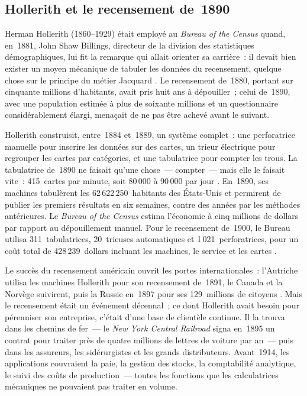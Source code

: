 \subsection{Hollerith et le recensement de~1890}\label{subsec:hollerith}

Herman Hollerith (1860--1929) était employé au \emph{Bureau of the Census} quand, en~1881, John Shaw Billings, directeur de la division des statistiques démographiques, lui fit la remarque qui allait orienter sa carrière~: il devait bien exister un moyen mécanique de tabuler les données du recensement, quelque chose sur le principe du métier Jacquard \parencite{cortada_before_1993}. Le recensement de~1880, portant sur cinquante millions d'habitants, avait pris huit ans à dépouiller~; celui de~1890, avec une population estimée à plus de soixante millions et un questionnaire considérablement élargi, menaçait de ne pas être achevé avant le suivant.

Hollerith construisit, entre~1884 et~1889, un système complet~: une perforatrice manuelle pour inscrire les données sur des cartes, un trieur électrique pour regrouper les cartes par catégories, et une tabulatrice pour compter les trous. La tabulatrice de~1890 ne faisait qu'une chose~--- compter~--- mais elle le faisait vite~: 415~cartes par minute, soit 80\,000 à 90\,000 par jour \parencite{cortada_before_1993}. En~1890, ses machines tabulèrent les 62\,622\,250~habitants des États-Unis et permirent de publier les premiers résultats en six semaines, contre des années par les méthodes antérieures. Le \emph{Bureau of the Census} estima l'économie à cinq millions de dollars par rapport au dépouillement manuel. Pour le recensement de~1900, le Bureau utilisa 311~tabulatrices, 20~trieuses automatiques et 1\,021~perforatrices, pour un coût total de 428\,239~dollars incluant les machines, le service et les cartes \parencite{cortada_before_1993}.

Le succès du recensement américain ouvrit les portes internationales~: l'Autriche utilisa les machines Hollerith pour son recensement de~1891, le Canada et la Norvège suivirent, puis la Russie en~1897 pour ses 129~millions de citoyens \parencite{cortada_before_1993}. Mais le recensement était un événement décennal~; ce dont Hollerith avait besoin pour pérenniser son entreprise, c'était d'une base de clientèle continue. Il la trouva dans les chemins de fer~--- le \emph{New York Central Railroad} signa en~1895 un contrat pour traiter près de quatre millions de lettres de voiture par an~--- puis dans les assureurs, les sidérurgistes et les grands distributeurs. Avant~1914, les applications couvraient la paie, la gestion des stocks, la comptabilité analytique, le suivi des coûts de production~--- toutes les fonctions que les calculatrices mécaniques ne pouvaient pas traiter en volume.


